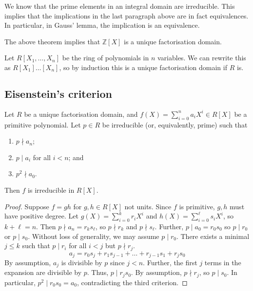 \begin{remark}
	We know that the prime elements in an integral domain are irreducible.
	This implies that the implications in the last paragraph above are in fact equivalences.
	In particular, in Gauss' lemma, the implication is an equivalence.
\end{remark}
\begin{example}
    The above theorem implies that \( \mathbb Z[X] \) is a unique factorisation domain.

    Let \( R[X_1, \dots, X_n] \) be the ring of polynomials in \( n \) variables.
    We can rewrite this as \( R[X_1]\dots[X_n] \), so by induction this is a unique factorisation domain if \( R \) is.
\end{example}

\subsection{Eisenstein's criterion}
\begin{proposition}
    Let \( R \) be a unique factorisation domain, and \( f(X) = \sum_{i=0}^n a_i X^i \in R[X] \) be a primitive polynomial.
    Let \( p \in R \) be irreducible (or, equivalently, prime) such that
    \begin{enumerate}
        \item \( p \nmid a_n \);
        \item \( p \mid a_i \) for all \( i < n \); and
        \item \( p^2 \nmid a_0 \).
    \end{enumerate}
    Then \( f \) is irreducible in \( R[X] \).
\end{proposition}
\begin{proof}
    Suppose \( f = gh \) for \( g,h \in R[X] \) not units.
    Since \( f \) is primitive, \( g, h \) must have positive degree.
    Let \( g(X) = \sum_{i=0}^k r_i X^i \) and \( h(X) = \sum_{i=0}^\ell s_i X^i \), so \( k + \ell = n \).
    Then \( p \nmid a_n = r_k s_\ell \), so \( p \nmid r_k \) and \( p \nmid s_\ell \).
    Further, \( p \mid a_0 = r_0 s_0 \) so \( p \mid r_0 \) or \( p \mid s_0 \).
    Without loss of generality, we may assume \( p \mid r_0 \).
    There exists a minimal \( j \leq k \) such that \( p \mid r_i \) for all \( i < j \) but \( p \nmid r_j \).
    \[ a_j = r_0 s_j + r_1 s_{j-1} + \dots + r_{j-1} s_1 + r_j s_0 \]
    By assumption, \( a_j \) is divisible by \( p \) since \( j < n \).
    Further, the first \( j \) terms in the expansion are divisible by \( p \).
    Thus, \( p \mid r_j s_0 \).
    By assumption, \( p \nmid r_j \), so \( p \mid s_0 \).
    In particular, \( p^2 \mid r_0 s_0 = a_0 \), contradicting the third criterion.
\end{proof}
